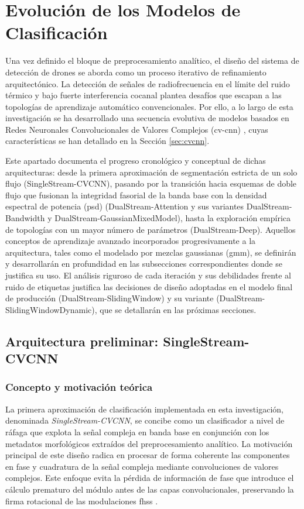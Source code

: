 \section{Evolución de los Modelos de Clasificación}
\label{sec:evolucion_modelos}

Una vez definido el bloque de preprocesamiento analítico, el diseño del sistema de detección de drones se aborda como un proceso iterativo de refinamiento arquitectónico. La detección de señales de radiofrecuencia en el límite del ruido térmico y bajo fuerte interferencia cocanal plantea desafíos que escapan a las topologías de aprendizaje automático convencionales. Por ello, a lo largo de esta investigación se ha desarrollado una secuencia evolutiva de modelos basados en Redes Neuronales Convolucionales de Valores Complejos (\gls{cv-cnn}) \cite{bassey_survey_2021}, cuyas características se han detallado en la Sección \ref{sec:cvcnn}. 

Este apartado documenta el progreso cronológico y conceptual de dichas arquitecturas: desde la primera aproximación de segmentación estricta de un solo flujo (SingleStream-CVCNN), pasando por la transición hacia esquemas de doble flujo que fusionan la integridad fasorial de la banda base con la densidad espectral de potencia (\gls{psd}) (DualStream-Attention y sus variantes DualStream-Bandwidth y DualStream-GaussianMixedModel), hasta la exploración empírica de topologías con un mayor número de parámetros (DualStream-Deep). Aquellos conceptos de aprendizaje avanzado incorporados progresivamente a la arquitectura, tales como el modelado por mezclas gaussianas (\gls{gmm}), se definirán y desarrollarán en profundidad en las subsecciones correspondientes donde se justifica su uso. El análisis riguroso de cada iteración y sus debilidades frente al ruido de etiquetas justifica las decisiones de diseño adoptadas en el modelo final de producción (DualStream-SlidingWindow) y su variante (DualStream-SlidingWindowDynamic), que se detallarán en las próximas secciones.

\subsection{Arquitectura preliminar: SingleStream-CVCNN}
\label{subsec:singlestream_cvcnn}

\subsubsection{Concepto y motivación teórica}
La primera aproximación de clasificación implementada en esta investigación, denominada \textit{SingleStream-CVCNN}, se concibe como un clasificador a nivel de ráfaga que explota la señal compleja en banda base en conjunción con los metadatos morfológicos extraídos del preprocesamiento analítico. La motivación principal de este diseño radica en procesar de forma coherente las componentes en fase y cuadratura de la señal compleja mediante convoluciones de valores complejos. Este enfoque evita la pérdida de información de fase que introduce el cálculo prematuro del módulo antes de las capas convolucionales, preservando la firma rotacional de las modulaciones \gls{fhss} \cite{trabelsi_deep_2018}.

